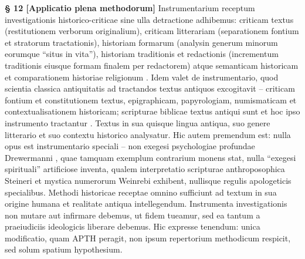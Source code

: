 \documentclass[11pt,a4paper]{article}
\makeatletter
\newcommand{\apth}{{\apthfont APTH}\hspace{0.15em}\xspace}
\newcommand{\apthsec}[3]{%
  \phantomsection%
  \def\@currentlabel{#1}%
  \label{sec:#3}%
  \textbf{§ #1 [#2]}%
}
\makeatother
\begin{document}
\apthsec{12}{Applicatio plena methodorum}{methodenanwendung} Instrumentarium receptum investigationis historico-criticae sine ulla detractione adhibemus: criticam textus (restitutionem verborum originalium), criticam litterariam (separationem fontium et stratorum tractationis), historiam formarum (analysin generum minorum eorumque ``situs in vita''), historiam traditionis et redactionis (incrementum traditionis eiusque formam finalem per redactorem) atque semanticam historicam et comparationem historiae religionum \citep{steck1999,schnelle2008,soeding1998}. Idem valet de instrumentario, quod scientia classica antiquitatis ad tractandos textus antiquos excogitavit -- criticam fontium et constitutionem textus, epigraphicam, papyrologiam, numismaticam et contextualisationem historicam; scripturae biblicae textus antiqui sunt et hoc ipso instrumento tractantur \citep{schaps2011,bernheim1889}. Textus in sua quisque lingua antiqua, suo genere litterario et suo contextu historico analysatur. Hic autem premendum est: nulla opus est instrumentario speciali -- non exegesi psychologiae profundae Drewermanni \citeyearpar{drewermann1984}, quae tamquam exemplum contrarium monens stat, nulla ``exegesi spirituali'' artificiose inventa, qualem interpretatio scripturae anthroposophica Steineri \citeyearpar{steiner1910} et mystica numerorum Weinrebi \citeyearpar{weinreb1963} exhibent, nullisque regulis apologeticis specialibus. Methodi historicae receptae omnino sufficiunt ad textum in sua origine humana et realitate antiqua intellegendum. Instrumenta investigationis non mutare aut infirmare debemus, ut fidem tueamur, sed ea tantum a praeiudiciis ideologicis liberare debemus. Hic expresse tenendum: unica modificatio, quam \apth peragit, non ipsum repertorium methodicum respicit, sed solum spatium hypothesium.
\end{document}
